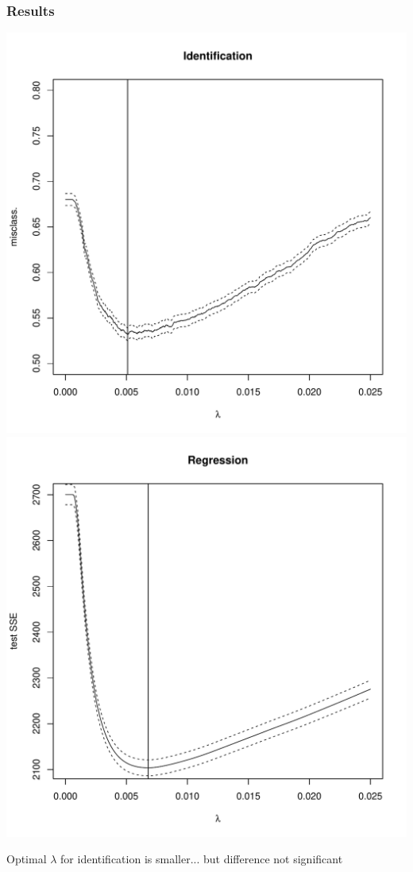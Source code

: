 \documentclass{beamer}
\begin{document}
\begin{frame}
\frametitle{Results}
\begin{center}
\includegraphics[scale = 0.35]{exp1_1.pdf}
\includegraphics[scale = 0.35]{exp1_2.pdf}
\end{center}
Optimal $\lambda$ for identification is smaller... but difference not significant
\end{frame}
\end{document}
